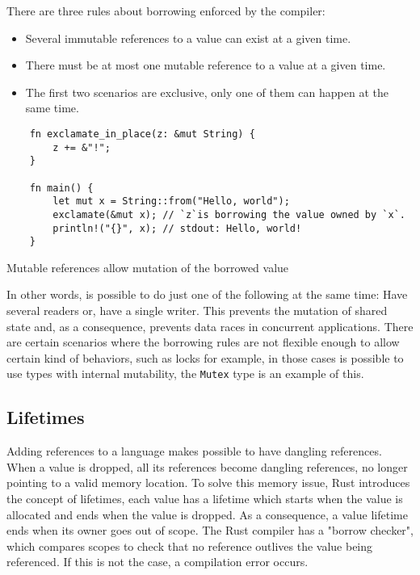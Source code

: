 There are three rules about borrowing enforced by the compiler:
\begin{itemize}
    \item Several immutable references to a value can exist at a given time.
    \item There must be at most one mutable reference to a value at a given time.
    \item The first two scenarios are exclusive, only one of them can happen at the same time.
\end{itemize}

\begin{listing}[ht]
	\begin{verbatim}
    fn exclamate_in_place(z: &mut String) {
        z += &"!";    
    }

    fn main() {
        let mut x = String::from("Hello, world");
        exclamate(&mut x); // `z`is borrowing the value owned by `x`.
        println!("{}", x); // stdout: Hello, world!
    }
	\end{verbatim}
  \caption{Mutable references allow mutation of the borrowed value}
  \label{lst:mutable_ref}
\end{listing}

In other words, is possible to do just one of the following at the same time: Have several readers or, have a single writer. This prevents the mutation of shared state and, as a consequence, prevents data races in concurrent applications. There are certain scenarios where the borrowing rules are not flexible enough to allow certain kind of behaviors, such as locks for example, in those cases is possible to use types with internal mutability, the \texttt{Mutex} type is an example of this.

\subsection{Lifetimes}
Adding references to a language makes possible to have dangling references. When a value is dropped, all its references become dangling references, no longer pointing to a valid memory location. To solve this memory issue, Rust introduces the concept of lifetimes, each value has a lifetime which starts when the value is allocated and ends when the value is dropped. As a consequence, a value lifetime ends when its owner goes out of scope. The Rust compiler has a "borrow checker", which compares scopes to check that no reference outlives the value being referenced. If this is not the case, a compilation error occurs.

